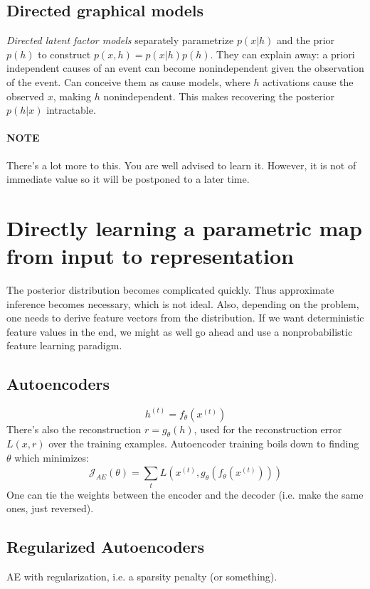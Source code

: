 \documentclass{article}
\begin{document}
\subsection{Directed graphical models}
\textit{Directed latent factor models} separately parametrize
$ p (x|h)  $ and the prior $ p (h)  $ to construct
$ p (x,h) = p (x|h) p (h)  $.
They can explain away: a priori independent causes of an event
can become nonindependent given the observation of the event.
Can conceive them as cause models, where $ h  $ activations
cause the observed $ x  $, making $ h  $ nonindependent.
This makes recovering the posterior $ p (h|x)  $ intractable.
\paragraph{NOTE} There's a lot more to this. You are well advised to learn it.
However, it is not of immediate value so it will be postponed to a later time.

\section{Directly learning a parametric map from input to representation}
The posterior distribution becomes complicated quickly.
Thus approximate inference becomes necessary, which is not ideal.
Also, depending on the problem, one needs to derive feature vectors
from the distribution.
If we want deterministic feature values in the end, we might as well
go ahead and use a nonprobabilistic feature learning paradigm.

\subsection{Autoencoders}
\begin{equation}
		h^{ (t) } = f_{ \theta } (x^{ (t) })
\end{equation}
There's also the reconstruction $ r = g_{ \theta } (h)  $,
used for the reconstruction error $ L (x,r)  $ over the
training examples.
Autoencoder training boils down to finding $ \theta  $
which minimizes:
\begin{equation}
		\mathcal{J}_{ AE } (\theta) =
		\sum_{t}^{} L (x^{ (t) }, g_{ \theta } (f_{ \theta } (x^{ (t) })))
\end{equation}
One can tie the weights between the encoder and the decoder (i.e. make the same ones,
just reversed).

\subsection{Regularized Autoencoders}
AE with regularization, i.e. a sparsity penalty (or something).
\end{document}
